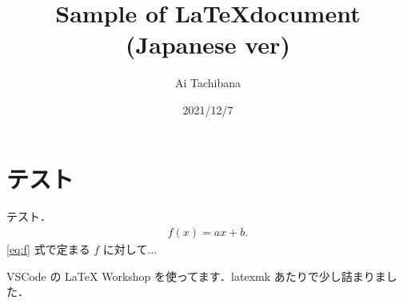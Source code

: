 \documentclass[dvipdfmx]{jsarticle}
\begin{document}
    \title{Sample of \LaTeX document (Japanese ver)}
    \author{Ai Tachibana}
    \date{2021/12/7}
    \maketitle

    \section{テスト}
    テスト．
    \begin{align}
        f(x) = ax + b. \label{eq:f}
    \end{align}
    \eqref{eq:f} 式で定まる $f$ に対して...

    VSCode の LaTeX Workshop を使ってます．latexmk あたりで少し詰まりました．
\end{document}
